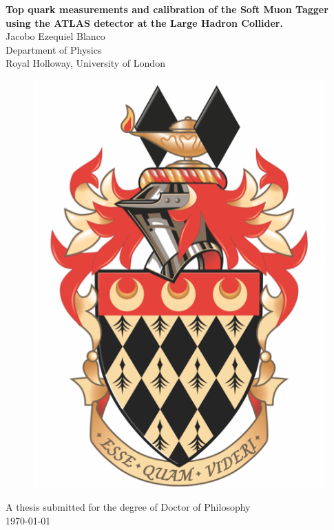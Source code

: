 \begin{titlepage}
\begin{center}
{\LARGE \textbf{Top quark measurements and calibration of the Soft Muon Tagger using the ATLAS detector at the Large Hadron Collider.\\}}
\vspace{1cm}
{\Large Jacobo Ezequiel Blanco\\}
\vspace{1cm}
{\large Department of Physics\\}
{\large Royal Holloway, University of London\\}

\begin{figure}[ht]
  \centering
  \includegraphics[width=0.3\linewidth]{./res/RHULCrest.png}
\end{figure}

{\Large A thesis submitted for the degree of Doctor of Philosophy\\}
\vspace{1cm}
{\today\\}
\end{center}
\end{titlepage}
